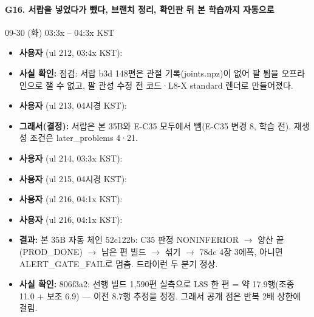 \paragraph{G16. 서랍을 넣었다가 뺐다, 브랜치 정리, 확인판 뒤 본 학습까지 자동으로}
{\small 09-30 (화) 03:3x -- 04:3x KST}
\begin{itemize}
  \item \textbf{사용자} (ul 212, 03:4x KST): 
  \item \textbf{사실 확인:} 점검: 서랍 b3d 148편은 관절 기록(joints.npz)이 없어 팔 튐을 오프라인으로 잴 수 없고, 팔 관성 수정 전 코드·L8-X standard 렌더로 만들어졌다.
  \item \textbf{사용자} (ul 213, 04시경 KST): 
  \item \textbf{그래서(결정):} 서랍은 본 35B와 E-C35 모두에서 뺌(E-C35 변경 8, 학습 전). 재생성 조건은 later\_problems 4·21.
  \item \textbf{사용자} (ul 214, 03:3x KST): 
  \item \textbf{사용자} (ul 215, 04시경 KST): 
  \item \textbf{사용자} (ul 216, 04:1x KST): 
  \item \textbf{사용자} (ul 216, 04:1x KST): 
  \item \textbf{결과:} 본 35B 자동 체인 52c122b: C35 판정 NONINFERIOR $\rightarrow$ 양산 끝(PROD\_DONE) $\rightarrow$ 남은 편 빌드 $\rightarrow$ 섞기 $\rightarrow$ 78dc 4장 3에폭, 아니면 ALERT\_GATE\_FAIL로 멈춤. 드라이런 두 분기 정상.
  \item \textbf{사실 확인:} 806f3a2: 선행 빌드 1,590편 실측으로 L8S 한 편 = 약 17.9행(조종 11.0 + 보조 6.9) --- 이전 8.7행 추정을 정정. 그래서 공개 점은 반복 2배 상한에 걸림.
\end{itemize}

